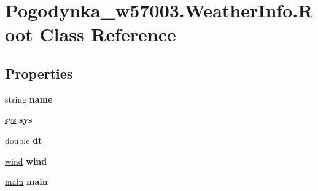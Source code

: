 \hypertarget{class_pogodynka__w57003_1_1_weather_info_1_1_root}{}\section{Pogodynka\+\_\+w57003.\+Weather\+Info.\+Root Class Reference}
\label{class_pogodynka__w57003_1_1_weather_info_1_1_root}
\subsection*{Properties}
\begin{DoxyCompactItemize}
\item 
\mbox{\label{class_pogodynka__w57003_1_1_weather_info_1_1_root_a4e784c691547e5eb47a40d8cc17b5805}} 
string {\bfseries name}
\item 
\mbox{\label{class_pogodynka__w57003_1_1_weather_info_1_1_root_a8404fcd32d7428b2782681cf25c9188c}} 
\mbox{\hyperlink{class_pogodynka__w57003_1_1_weather_info_1_1sys}{sys}} {\bfseries sys}
\item 
\mbox{\label{class_pogodynka__w57003_1_1_weather_info_1_1_root_a41b80a99d4e4864b40a5d745f6a93b34}} 
double {\bfseries dt}
\item 
\mbox{\label{class_pogodynka__w57003_1_1_weather_info_1_1_root_a3dd37af5f4d666b11cf02f80616ceb58}} 
\mbox{\hyperlink{class_pogodynka__w57003_1_1_weather_info_1_1wind}{wind}} {\bfseries wind}
\item 
\mbox{\label{class_pogodynka__w57003_1_1_weather_info_1_1_root_adea9bc13eac4c39acf91d8e9a880daf6}} 
\mbox{\hyperlink{class_pogodynka__w57003_1_1_weather_info_1_1main}{main}} {\bfseries main}

\end{DoxyCompactItemize}
